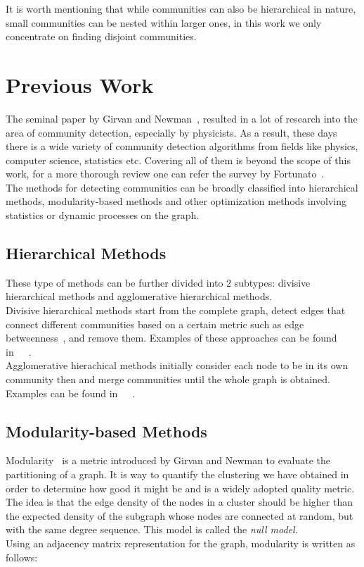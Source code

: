 \begin{spacing}{1.5}
\indent It is worth mentioning that while communities can also be hierarchical in nature, small communities can be nested within larger ones, in this work we only concentrate on finding disjoint communities.

\section{Previous Work}

The seminal paper by Girvan and Newman~\cite{Girvan11062002}, resulted in a lot of research into the area of community detection, especially by physicists. As a result, these days there is a wide variety of community detection algorithms from fields like physics, computer science, statistics etc. Covering all of them is beyond the scope of this work, for a more thorough review one can refer the survey by Fortunato~\cite{Fortunato201075}.\\
\indent The methods for detecting communities can be broadly classified into hierarchical methods, modularity-based methods and other optimization methods involving statistics or dynamic processes on the graph.

\subsection{Hierarchical Methods}

These type of methods can be further divided into 2 subtypes: divisive hierarchical methods and agglomerative hierarchical methods.\\
\indent Divisive hierarchical methods start from the complete graph, detect edges that connect different communities based on a certain metric such as edge betweenness~\cite{Girvan11062002}, and remove them. Examples of these approaches can be found in~\cite{Girvan11062002}~\cite{Radicchi02032004}~\cite{PhysRevE.69.026113}.\\
\indent Agglomerative hierachical methods initially consider each node to be in its own community then and merge communities until the whole graph is obtained. Examples can be found in~\cite{newman03fast}~\cite{blondel2008fuc}~\cite{Clauset2004}.

\subsection{Modularity-based Methods}

Modularity~\cite{PhysRevE.69.026113} is a metric introduced by Girvan and Newman to evaluate the partitioning of a graph. It is way to quantify the clustering we have obtained in order to determine how good it might be and is a widely adopted quality metric. The idea is that the edge density of the nodes in a cluster should be higher than the expected density of the subgraph whose nodes are connected at random, but with the same degree sequence. This model is called the \emph{null model}. \\
\indent Using an adjacency matrix representation for the graph, modularity is written as follows:


\end{spacing}
